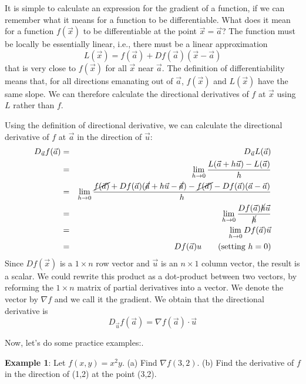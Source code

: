 \documentclass[conference,final,11pt,technote,onecolumn]{IEEEtran}\usepackage[]{graphicx}\usepackage[]{color}
\begin{document}
It is simple to calculate an expression for the gradient of a function, if we can remember what it means for a function to be differentiable. What does it mean for a function $f(\vec x)$ to be differentiable at the point $\vec x = \vec a$? The function must be locally be essentially linear, i.e., there must be a linear approximation
\[ L(\vec x) = f(\vec a) + Df(\vec a)(\vec x - \vec a) \]
that is very close to $f(\vec x)$ for all $\vec x$ near $\vec a$. The definition of differentiability means that, for all directions emanating out of $\vec a$, $f(\vec x)$ and $L(\vec x)$ have the same slope. We can therefore calculate the directional derivatives of $f$ at $\vec x$ using $L$ rather than $f$.

Using the definition of directional derivative, we can calculate the directional derivative of $f$ at $\vec a$ in the direction of $\vec u$:
\begin{eqnarray}
\nonumber D_{\vec u}f(\vec a) &=& D_{\vec u}L(\vec a)\\
\nonumber &=& \lim_{h\rightarrow 0}\dfrac{L(\vec a + h\vec u)-L(\vec a)}{h}\\
\nonumber &=& \lim_{h\rightarrow 0}\dfrac{\cancel{f(\vec a)}+Df(\vec a)(\cancel{\vec a} + h\vec u - \cancel{\vec a})-\cancel{f(\vec a)} - Df(\vec a)(\vec a-\vec a)}{h}\\
\nonumber &=& \lim_{h\rightarrow 0}\dfrac{Df(\vec a)\cancel{h}\vec u}{\cancel{h}}\\
\nonumber &=& \lim_{h\rightarrow 0}Df(\vec a)\vec u\\
\nonumber &=& Df(\vec a)u\qquad (\text{setting $h=0$})
\end{eqnarray}
Since $Df(\vec x)$ is a $1\times n$ row vector and $\vec u$ is an $n\times 1$ column vector, the result is a scalar. We could rewrite this product as a dot-product between two vectors, by reforming the $1\times n$ matrix of partial derivatives into a vector. We denote the vector by $\nabla f$ and we call it the gradient. We obtain that the directional derivative is 
\[ D_{\vec u}f(\vec a) = \nabla f(\vec a)\cdot \vec u \]

Now, let's do some practice examples:\cite{mathInsight:DirectionalDerivativeExamples}.

\textbf{Example 1}: Let $f(x,y) = x^2y$. (a) Find $\nabla f(3,2)$. (b) Find the derivative of $f$ in the direction of (1,2) at the point (3,2).
\end{document}
